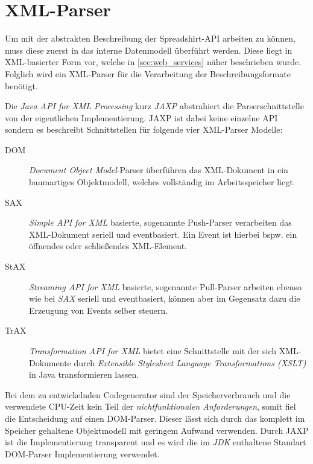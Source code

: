 \section{XML-Parser}
\label{sec:xml_parser}

Um mit der abstrakten Beschreibung der Spreadshirt-API arbeiten zu können, muss diese zuerst in das interne Datenmodell überführt werden. Diese liegt in XML-basierter Form vor, welche in \cref{sec:web_services} näher beschrieben wurde. Folglich wird ein XML-Parser für die Verarbeitung der Beschreibungsformate benötigt.  

Die \emph{Java API for XML Processing} kurz \emph{JAXP} abstrahiert die Parserschnittstelle von der eigentlichen Implementierung. JAXP ist dabei keine einzelne API sondern es beschreibt Schnittstellen für folgende vier XML-Parser Modelle:

\begin{description}
    \item[DOM] \emph{Document Object Model}-Parser überführen das XML-Dokument in ein baumartiges Objektmodell, welches vollständig im Arbeitsspeicher liegt.
    \item[SAX] \emph{Simple API for XML} basierte, sogenannte Push-Parser verarbeiten das XML-Dokument seriell und eventbasiert. Ein Event ist hierbei bspw. ein öffnendes oder schließendes XML-Element.
    \item[StAX] \emph{Streaming API for XML} basierte, sogenannte Pull-Parser arbeiten ebenso wie bei \emph{SAX} seriell und eventbasiert, können aber im Gegensatz dazu die Erzeugung von Events selber steuern. 
    \item[TrAX] \emph{Transformation API for XML} bietet eine Schnittstelle mit der sich XML-Dokumente durch \emph{Extensible Stylesheet Language Transformations (XSLT)} in Java transformieren lassen.
\end{description}

Bei dem zu entwickelnden Codegenerator sind der Speicherverbrauch und die verwendete CPU-Zeit kein Teil der \emph{nichtfunktionalen Anforderungen}, somit fiel die Entscheidung auf einen DOM-Parser. Dieser lässt sich durch das komplett im Speicher gehaltene Objektmodell mit geringem Aufwand verwenden. Durch JAXP ist die Implementierung transparent und es wird die im \emph{JDK} enthaltene Standart DOM-Parser Implementierung verwendet.

